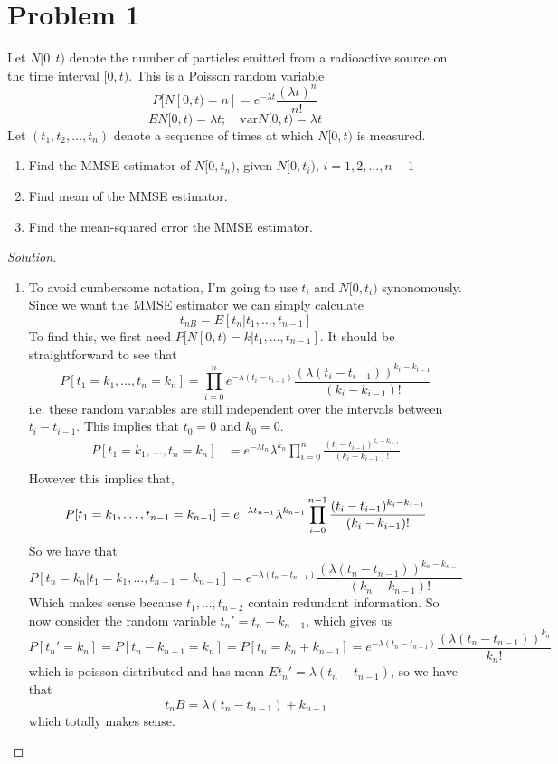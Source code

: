 \documentclass[a4paper]{article}
\begin{document}
\section*{Problem 1}
Let $N[0,t)$ denote the number of particles emitted from a radioactive source on the time interval $[0,t)$. This is a Poisson random variable
\[
  P[N[0,t) = n] = e^{-\lambda t}\frac{(\lambda t)^n}{n!}
\]
\[
  EN[0,t) = \lambda t; \quad \text{var}N[0,t) = \lambda t
\]
Let $(t_1, t_2, \dots, t_n)$ denote a sequence of times at which $N[0,t)$ is measured.
\begin{enumerate}
  \item Find the MMSE estimator of $N[0,t_n)$, given $N[0,t_i)$, $i=1,2, \dots, n-1$
  \item Find mean of the MMSE estimator.
  \item Find the mean-squared error the MMSE estimator.
\end{enumerate}

\begin{proof}[Solution]
  \begin{enumerate}
    \item To avoid cumbersome notation, I'm going to use $t_i$ and $N[0,t_i)$ synonomously. Since we want the MMSE estimator we can simply calculate
      \[
        t_{nB} = E[t_n|t_1, \dots, t_{n-1}]
      \]
      To find this, we first need $P[N[0,t) = k | t_1, \dots, t_{n-1}]$. It should be straightforward to see that
      \[
        P[t_1 = k_1, \dots, t_n = k_n] = \prod_{i=0}^n e^{-\lambda (t_i - t_{i-1})} \frac{(\lambda(t_i - t_{i-1}))^{k_i - k_{i-1}}}{(k_i - k_{i-1})!}
      \]
      i.e. these random variables are still independent over the intervals between $t_i - t_{i-1}$. This implies that $t_0 = 0$ and $k_0 = 0$.
      \[
        \begin{aligned}
          P[t_1 = k_1, \dots, t_n = k_n] &= e^{-\lambda t_n}\lambda^{k_n} \prod_{i=0}^n  \frac{(t_i - t_{i-1})^{k_i-k_{i-1}}}{(k_i - k_{i-1})!} \\
        \end{aligned}
      \]
      However this implies that,
      \[
        P[t_1 = k_1, \dots, t_{n-1} = k_{n-1}] = e^{-\lambda t_{n-1}} \lambda^{k_{n-1}} \prod_{i=0}^{n-1}  \frac{(t_i - t_{i-1})^{k_i-k_{i-1}}}{(k_i - k_{i-1})!} \\
      \]
      So we have that 
      \[
        P[t_n = k_n| t_1 = k_1, \dots, t_{n-1} = k_{n-1}] =  e^{-\lambda(t_n - t_{n-1})} \frac{(\lambda(t_n - t_{n-1}))^{k_n - k_{n-1}}}{(k_n - k_{n-1})!}
      \]
      Which makes sense because $t_1, \dots, t_{n-2}$ contain redundant information. So now consider the random variable $t_n' = t_n - k_{n-1}$, which gives us
      \[
        P[t_n' = k_n] = P[t_n - k_{n-1} = k_n] = P[t_n = k_n + k_{n-1}] = e^{-\lambda (t_n - t_{n-1})} \frac{(\lambda(t_n - t_{n-1}))^{k_n}}{k_n!}
      \]
      which is poisson distributed and has mean $E t_n' = \lambda(t_n - t_{n-1})$, so we have that
      \[
        t_nB = \lambda(t_n - t_{n-1}) + k_{n-1}
      \]
      which totally makes sense.

  \end{enumerate}
\end{proof}
\end{document}
